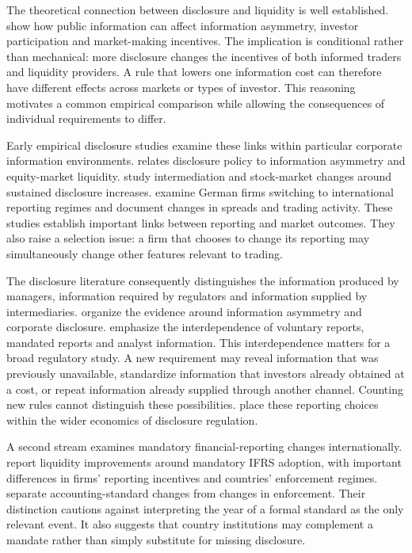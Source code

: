 \documentclass[12pt,letterpaper]{article}
\begin{document}
The theoretical connection between disclosure and liquidity is well established. \citet{diamond1991} show how public information can affect information asymmetry, investor participation and market-making incentives. The implication is conditional rather than mechanical: more disclosure changes the incentives of both informed traders and liquidity providers. A rule that lowers one information cost can therefore have different effects across markets or types of investor. This reasoning motivates a common empirical comparison while allowing the consequences of individual requirements to differ.


Early empirical disclosure studies examine these links within particular corporate information environments. \citet{welker1995} relates disclosure policy to information asymmetry and equity-market liquidity. \citet{healy1999} study intermediation and stock-market changes around sustained disclosure increases. \citet{leuz2000} examine German firms switching to international reporting regimes and document changes in spreads and trading activity. These studies establish important links between reporting and market outcomes. They also raise a selection issue: a firm that chooses to change its reporting may simultaneously change other features relevant to trading.


The disclosure literature consequently distinguishes the information produced by managers, information required by regulators and information supplied by intermediaries. \citet{healy2001} organize the evidence around information asymmetry and corporate disclosure. \citet{beyer2010} emphasize the interdependence of voluntary reports, mandated reports and analyst information. This interdependence matters for a broad regulatory study. A new requirement may reveal information that was previously unavailable, standardize information that investors already obtained at a cost, or repeat information already supplied through another channel. Counting new rules cannot distinguish these possibilities. \citet{leuz2016} place these reporting choices within the wider economics of disclosure regulation.


A second stream examines mandatory financial-reporting changes internationally. \citet{daske2008} report liquidity improvements around mandatory IFRS adoption, with important differences in firms' reporting incentives and countries' enforcement regimes. \citet{christensen2013} separate accounting-standard changes from changes in enforcement. Their distinction cautions against interpreting the year of a formal standard as the only relevant event. It also suggests that country institutions may complement a mandate rather than simply substitute for missing disclosure.
\end{document}
